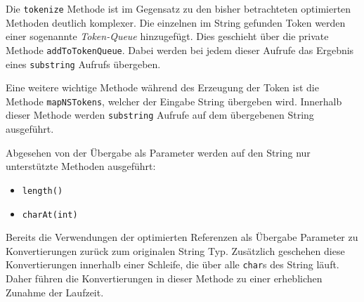 Die \texttt{tokenize} Methode ist im Gegensatz zu den bisher betrachteten optimierten Methoden deutlich
komplexer. Die einzelnen im String gefunden Token werden einer sogenannte \textit{Token-Queue} 
hinzugefügt. Dies geschieht über die private Methode \texttt{addToTokenQueue}. Dabei 
werden bei jedem dieser Aufrufe das Ergebnis eines \texttt{substring} Aufrufs übergeben.

Eine weitere wichtige Methode während des Erzeugung der Token ist die Methode \texttt{mapNSTokens},
welcher der Eingabe String übergeben wird. Innerhalb dieser Methode werden \texttt{substring}  
Aufrufe auf dem übergebenen String ausgeführt.

Abgesehen von der Übergabe als Parameter werden auf den String nur unterstützte Methoden 
ausgeführt:

\begin{itemize}
 	\item \texttt{length()}
 	\item \texttt{charAt(int)}
\end{itemize} 

Bereits die Verwendungen der optimierten Referenzen als Übergabe Parameter zu 
Konvertierungen zurück zum originalen String Typ. Zusätzlich geschehen diese Konvertierungen 
innerhalb einer Schleife, die über alle \texttt{char}s
des String läuft. Daher führen die Konvertierungen in dieser Methode zu einer 
erheblichen Zunahme der Laufzeit.  

